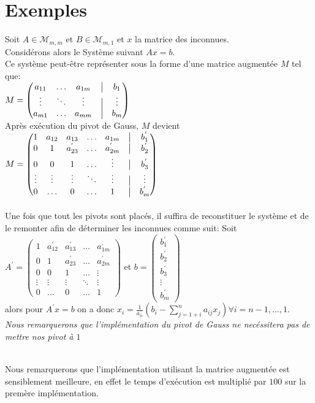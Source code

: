 \section{Exemples}
Soit $A \in \mathcal{M}_{m,m}$ et $B \in \mathcal{M}_{m,1}$ et $x$ la matrice des inconnues. \\
Considérons alors le Système suivant $Ax=b$.\\
Ce système peut-être représenter sous la forme d'une matrice augmentée $M$ tel que:\\
$
M =  \begin{pmatrix}
a_{11}& \ldots & a_{1m} &\bigm| & b_{1} \\
\vdots & \ddots & \vdots&\bigm| &  \vdots \\
a_{m1} & \ldots & a_{mm} &\bigm|& b_{m} 
\end{pmatrix}
$
\\
Après exécution du pivot de Gauss, $M$ devient \\
$
M =  \begin{pmatrix}
1& a_{12}& a_{13} &\ldots & a_{1m} &\bigm| & b_{1}^{'} \\
0 & 1 & a_{23}^{'}&  \ldots &a_{2m}^{'} &\bigm| & b_{2}^{'} \\
0 & 0 & 1 & \ldots &\vdots &\bigm| & b_{3}^{'} \\
\vdots & \vdots & \vdots& \ddots& \vdots &\bigm| &  \vdots \\
0 & \ldots &0 &\ldots &1&\bigm|& b_{m}^{'}
\end{pmatrix}
$  \\ \\
Une fois que tout les pivots sont placés, il suffira de reconstituer le système et de le remonter afin de déterminer les inconnues comme suit:
Soit $A^{'}=  \begin{pmatrix}
1& a_{12}^{'}& a_{13}^{'} &\ldots & a_{1m}^{,} \\
0 & 1 & a_{23}^{'}&  \ldots &a_{2m}^{'} \\
0 & 0 & 1 & \ldots &\vdots\\
\vdots & \vdots & \vdots& \ddots& \vdots \\
0 & \ldots &0 &\ldots &1
\end{pmatrix}
$
et $b = \begin{pmatrix}
b_{1}^{'} \\
b_{2}^{'} \\
b_{3}^{'} \\
\vdots \\
 b_{m}^{'}
\end{pmatrix}
$
\\
alors pour $A^{'}x = b$ on a donc $x_i = \frac{1}{a_{ii}}\left( b_i-\sum\limits_{j=1+i}^n a_{ij}x_j \right) \forall i = n-1, \ldots, 1$. \\
\textit{Nous remarquerons que l'implémentation du pivot de Gauss ne necéssitera pas de mettre nos pivot à $1$}



\\
Nous remarquerons que l'implémentation utilisant la matrice augmentée est sensiblement meilleure, en effet le temps d'exécution est multiplié par $100$ sur la premère implémentation.